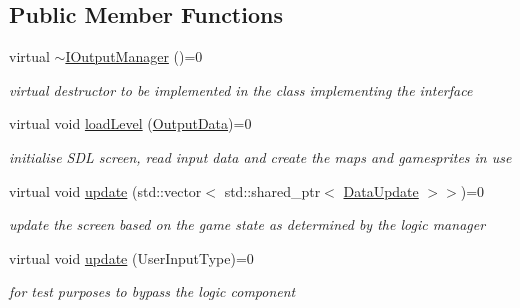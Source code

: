 \subsection*{Public Member Functions}
\begin{DoxyCompactItemize}
\item 
\mbox{\label{class_i_output_manager_a7442c5161bf453dc13605f7aaeeea2b5}} 
virtual \mbox{\hyperlink{class_i_output_manager_a7442c5161bf453dc13605f7aaeeea2b5}{$\sim$\+I\+Output\+Manager}} ()=0
\begin{DoxyCompactList}\small\item\em virtual destructor to be implemented in the class implementing the interface \end{DoxyCompactList}\item 
\mbox{\label{class_i_output_manager_a50a935d76cf10427b0977406a2338146}} 
virtual void \mbox{\hyperlink{class_i_output_manager_a50a935d76cf10427b0977406a2338146}{load\+Level}} (\mbox{\hyperlink{class_output_data}{Output\+Data}})=0
\begin{DoxyCompactList}\small\item\em initialise S\+DL screen, read input data and create the maps and gamesprites in use \end{DoxyCompactList}\item 
\mbox{\label{class_i_output_manager_a41892abec0b57bc1244492f42f32901b}} 
virtual void \mbox{\hyperlink{class_i_output_manager_a41892abec0b57bc1244492f42f32901b}{update}} (std\+::vector$<$ std\+::shared\+\_\+ptr$<$ \mbox{\hyperlink{class_data_update}{Data\+Update}} $>$$>$)=0
\begin{DoxyCompactList}\small\item\em update the screen based on the game state as determined by the logic manager \end{DoxyCompactList}\item 
\mbox{\label{class_i_output_manager_aef1aaf499f3eee5927cb2833af39ce43}} 
virtual void \mbox{\hyperlink{class_i_output_manager_aef1aaf499f3eee5927cb2833af39ce43}{update}} (User\+Input\+Type)=0
\begin{DoxyCompactList}\small\item\em for test purposes to bypass the logic component \end{DoxyCompactList}\item 
$$
\end{DoxyCompactItemize}
